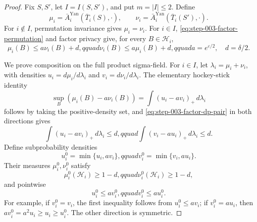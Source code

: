\begin{proof}
Fix \(S,S'\), let \(I=I(S,S')\), and put \(m=|I|\le2\).  Define
\[
\mu_i=\bar A_i^{\mathrm{Yan}}(\bar T_i(S),\cdot),
\qquad
\nu_i=\bar A_i^{\mathrm{Yan}}(\bar T_i(S'),\cdot).
\]
For \(i\notin I\), permutation invariance gives \(\mu_i=\nu_i\).  For
\(i\in I\), \eqref{eq:step-003-factor-permutation} and factor privacy give,
for every \(B\in\mathscr H_i\),
\begin{equation}\label{eq:step-003-factor-dp-pair}
\mu_i(B)\le a\nu_i(B)+d,qquad
\nu_i(B)\le a\mu_i(B)+d,qquad
a=e^{\varepsilon/2},\quad d=\delta/2.
\end{equation}

We prove composition on the full product sigma-field.  For \(i\in I\), let
\(\lambda_i=\mu_i+\nu_i\), with densities
\(u_i=d\mu_i/d\lambda_i\) and \(v_i=d\nu_i/d\lambda_i\).  The elementary
hockey-stick identity
\[
\sup_B(\mu_i(B)-a\nu_i(B))
=\int(u_i-av_i)_+\,d\lambda_i
\]
follows by taking the positive-density set, and
\eqref{eq:step-003-factor-dp-pair} in both directions gives
\begin{equation}\label{eq:step-003-hockey-stick}
\int(u_i-av_i)_+\,d\lambda_i\le d,qquad
\int(v_i-au_i)_+\,d\lambda_i\le d.
\end{equation}
Define subprobability densities
\begin{equation}\label{eq:step-003-truncated-densities}
u_i^0=\min\{u_i,av_i\},qquad
v_i^0=\min\{v_i,au_i\}.
\end{equation}
Their measures \(\mu_i^0,\nu_i^0\) satisfy
\begin{equation}\label{eq:step-003-truncated-mass}
\mu_i^0(\mathcal H_i)\ge1-d,qquad
\nu_i^0(\mathcal H_i)\ge1-d,
\end{equation}
and pointwise
\begin{equation}\label{eq:step-003-mutual-domination}
u_i^0\le av_i^0,qquad v_i^0\le au_i^0.
\end{equation}
For example, if \(v_i^0=v_i\), the first inequality follows from
\(u_i^0\le av_i\); if \(v_i^0=au_i\), then
\(av_i^0=a^2u_i\ge u_i\ge u_i^0\).  The other direction is symmetric.


\end{proof}
